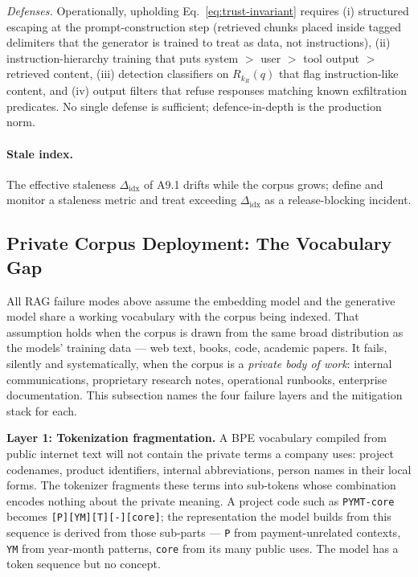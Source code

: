 \emph{Defenses.} Operationally, upholding
Eq.~\eqref{eq:trust-invariant} requires (i) structured escaping at
the prompt-construction step (retrieved chunks placed inside tagged
delimiters that the generator is trained to treat as data, not
instructions), (ii) instruction-hierarchy training
\citep{wallace2024instruction} that puts system $>$ user $>$ tool
output $>$ retrieved content, (iii) detection classifiers on
$R_{k_R}(q)$ that flag instruction-like content, and (iv) output
filters that refuse responses matching known exfiltration
predicates. No single defense is sufficient; defence-in-depth is
the production norm.

\paragraph{Stale index.} The effective staleness $\Delta_\mathrm{idx}$
of A9.1 drifts while the corpus grows; define and monitor a
staleness metric and treat exceeding $\Delta_\mathrm{idx}$ as a
release-blocking incident.

\subsection{Private Corpus Deployment: The Vocabulary Gap}
\label{sec:private-corpus-vocab-gap}

All RAG failure modes above assume the embedding model and the
generative model share a working vocabulary with the corpus being
indexed. That assumption holds when the corpus is drawn from the
same broad distribution as the models' training data --- web text,
books, code, academic papers. It fails, silently and
systematically, when the corpus is a \emph{private body of work}:
internal communications, proprietary research notes, operational
runbooks, enterprise documentation. This subsection names the
four failure layers and the mitigation stack for each.

\textbf{Layer 1: Tokenization fragmentation.}
A BPE vocabulary compiled from public internet text will not
contain the private terms a company uses: project codenames,
product identifiers, internal abbreviations, person names in
their local forms. The tokenizer fragments these terms into
sub-tokens whose combination encodes nothing about the private
meaning. A project code such as \texttt{PYMT-core} becomes
\texttt{[P][YM][T][-][core]}; the representation the model
builds from this sequence is derived from those sub-parts ---
\texttt{P} from payment-unrelated contexts, \texttt{YM} from
year-month patterns, \texttt{core} from its many public uses.
The model has a token sequence but no concept.

